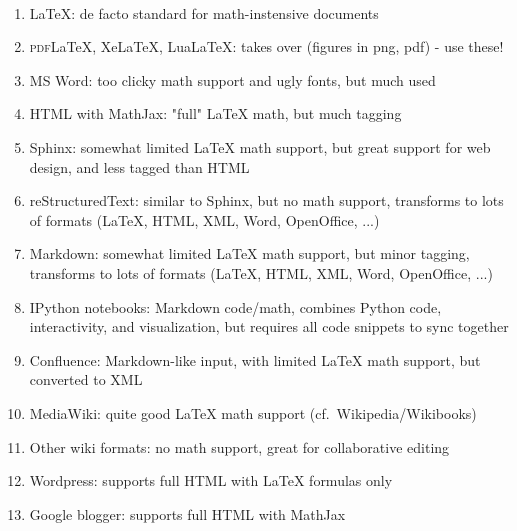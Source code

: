 \documentclass[%
twoside,                 %
final,                   %
10pt]{article}
\begin{document}
\paragraph{}
\begin{enumerate}
\item {\LaTeX}: de facto standard for math-instensive documents

\item \textsc{pdf}{\LaTeX}, XeLaTeX, LuaLaTeX: takes over (figures in png, pdf) - use these!

\item MS Word: too clicky math support and ugly fonts, but much used

\item HTML with MathJax: "full" {\LaTeX} math, but much tagging

\item Sphinx: somewhat limited {\LaTeX} math support, but great support for web design, and less tagged than HTML

\item reStructuredText: similar to Sphinx, but no math support, transforms to lots of formats ({\LaTeX}, HTML, XML, Word, OpenOffice, ...)

\item Markdown: somewhat limited {\LaTeX} math support, but minor tagging, transforms to lots of formats ({\LaTeX}, HTML, XML, Word, OpenOffice, ...)

\item IPython notebooks: Markdown code/math, combines Python code, interactivity, and visualization, but requires all code snippets to sync together

\item Confluence: Markdown-like input, with limited {\LaTeX} math support, but converted to XML

\item MediaWiki: quite good {\LaTeX} math support (cf.~Wikipedia/Wikibooks)

\item Other wiki formats: no math support, great for collaborative editing

\item Wordpress: supports full HTML with {\LaTeX} formulas only

\item Google blogger: supports full HTML with MathJax
\end{enumerate}

\noindent
\end{document}
